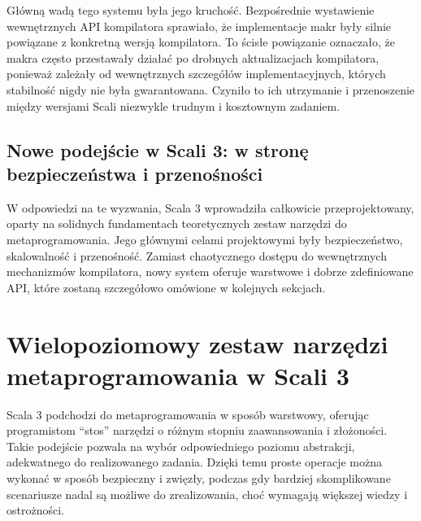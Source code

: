 Główną wadą tego systemu była jego kruchość.
Bezpośrednie wystawienie wewnętrznych API kompilatora sprawiało, że implementacje makr były silnie powiązane z konkretną wersją kompilatora.
To ścisłe powiązanie oznaczało, że makra często przestawały działać po drobnych aktualizacjach kompilatora, ponieważ zależały od wewnętrznych szczegółów implementacyjnych, których stabilność nigdy nie była gwarantowana.
Czyniło to ich utrzymanie i przenoszenie między wersjami Scali niezwykle trudnym i kosztownym zadaniem.

\subsection{Nowe podejście w Scali 3: w stronę bezpieczeństwa i przenośności}
W odpowiedzi na te wyzwania, Scala 3 wprowadziła całkowicie przeprojektowany, oparty na solidnych fundamentach teoretycznych zestaw narzędzi do metaprogramowania.
Jego głównymi celami projektowymi były bezpieczeństwo, skalowalność i przenośność.
Zamiast chaotycznego dostępu do wewnętrznych mechanizmów kompilatora, nowy system oferuje warstwowe i dobrze zdefiniowane API, które zostaną szczegółowo omówione w kolejnych sekcjach.


\section{Wielopoziomowy zestaw narzędzi metaprogramowania w Scali 3}
Scala 3 podchodzi do metaprogramowania w sposób warstwowy, oferując programistom \enquote{stos} narzędzi o różnym stopniu zaawansowania i złożoności.
Takie podejście pozwala na wybór odpowiedniego poziomu abstrakcji, adekwatnego do realizowanego zadania.
Dzięki temu proste operacje można wykonać w sposób bezpieczny i zwięzły, podczas gdy bardziej skomplikowane scenariusze nadal są możliwe do zrealizowania, choć wymagają większej wiedzy i ostrożności.

